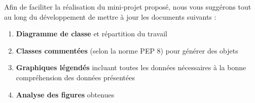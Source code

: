 
Afin de faciliter la réalisation du mini-projet proposé, nous vous suggérons tout au long du développement de mettre à jour les documents suivants :

\begin{enumerate}
\item \textbf{Diagramme de classe} et répartition du travail
\item \textbf{Classes commentées} (selon la norme PEP 8) pour générer des objets 
\item \textbf{Graphiques légendés} incluant toutes les données nécessaires à la bonne compréhension des données présentées
\item \textbf{Analyse des figures} obtenues 
\end{enumerate}


